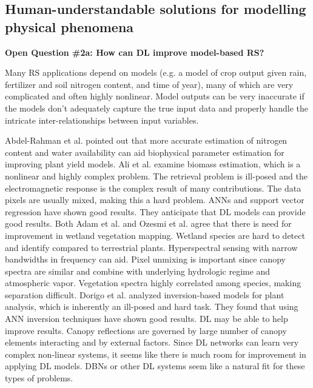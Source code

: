 \documentclass[12pt]{spieman}
\begin{document}
\begin{spacing}{1}
%
%
\subsection{Human-understandable solutions for modelling physical phenomena}
\label{subsec:ChallengesOpportunities_ii}
\textbf{Open Question \#2a: How can DL improve model-based RS?}

Many RS applications depend on models (e.g. a model of crop output given rain, fertilizer and soil nitrogen content, and time of year), many of which are very complicated and often highly nonlinear. Model outputs can be very inaccurate if the models don't adequately capture the true input data and properly handle the intricate inter-relationships between input variables.

Abdel-Rahman et al. \cite{abdel2008application} pointed out that more accurate estimation of nitrogen content and water availability can aid biophysical parameter estimation for improving plant yield models. Ali et al. \cite{Ali201Review} examine biomass estimation, which is a nonlinear and highly complex problem. The retrieval problem is ill-posed and the electromagnetic response is the complex result of many contributions. The data pixels are usually mixed, making this a hard problem. ANNs and support vector regression have shown good results. They anticipate that DL models can provide good results. Both Adam et al. \cite{Adam2010MultiSpectral} and Ozesmi et al. \cite{ozesmi2002satellite} agree that there is need for improvement in wetland vegetation mapping. Wetland species are hard to detect and identify compared to terrestrial plants. Hyperspectral sensing with narrow bandwidths in frequency can aid. Pixel unmixing is important since canopy spectra are similar and combine with underlying hydrologic regime and atmospheric vapor. Vegetation spectra highly correlated among species, making separation difficult. Dorigo et al. \cite{dorigo2007review} analyzed inversion-based models for plant analysis, which is inherently an ill-posed and hard task. They found that using ANN inversion techniques have shown good results. DL may be able to help improve results. Canopy reflections are governed by large number of canopy elements interacting and by external factors. Since DL networks can learn very complex non-linear systems, it seems like there is much room for improvement in applying DL models. DBNs or other DL systems seem like a natural fit for these types of problems.


\end{spacing}
\end{document}
